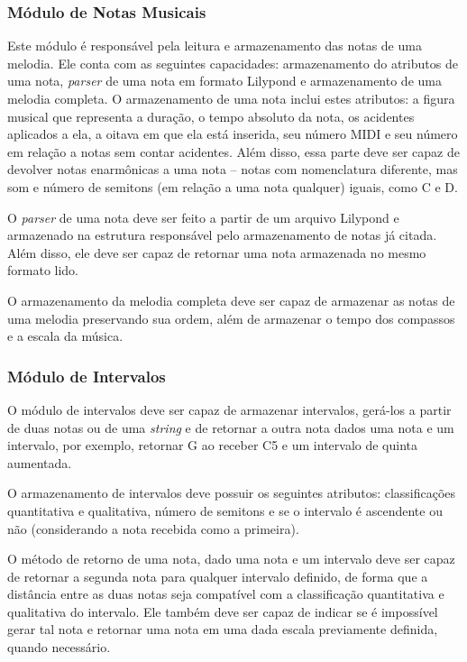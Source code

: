     \subsubsection[Módulo de Notas Musicais]{Módulo de Notas Musicais}

      Este módulo é responsável pela leitura e armazenamento das notas de uma melodia. Ele conta com as seguintes capacidades: armazenamento do atributos de uma nota, \textit{parser} de uma nota em formato Lilypond e armazenamento de uma melodia completa. O armazenamento de uma nota inclui estes atributos: a figura musical que representa a duração, o tempo absoluto da nota, os acidentes aplicados a ela, a oitava em que ela está inserida, seu número MIDI e seu número em relação a notas sem contar acidentes. Além disso, essa parte deve ser capaz de devolver notas enarmônicas a uma nota -- notas com nomenclatura diferente, mas som e número de semitons (em relação a uma nota qualquer) iguais, como C\sh{}  e D\fl.

      O \textit{parser} de uma nota deve ser feito a partir de um arquivo Lilypond e armazenado na estrutura responsável pelo armazenamento de notas já citada. Além disso, ele deve ser capaz de retornar uma nota armazenada no mesmo formato lido.

      O armazenamento da melodia completa deve ser capaz de armazenar as notas de uma melodia preservando sua ordem, além de armazenar o tempo dos compassos e a escala da música.

    \subsubsection[Módulo de Intervalos]{Módulo de Intervalos}

      O módulo de intervalos deve ser capaz de armazenar intervalos, gerá-los a partir de duas notas ou de uma \textit{string} e de retornar a outra nota dados uma nota e um intervalo, por exemplo, retornar G ao receber C5 e um intervalo de quinta aumentada.

      O armazenamento de intervalos deve possuir os seguintes atributos: classificações quantitativa e qualitativa, número de semitons e se o intervalo é ascendente ou não (considerando a nota recebida como a primeira).

      O método de retorno de uma nota, dado uma nota e um intervalo deve ser capaz de retornar a segunda nota para qualquer intervalo definido, de forma que a distância entre as duas notas seja compatível com a classificação quantitativa e qualitativa do intervalo. Ele também deve ser capaz de indicar se é impossível gerar tal nota e retornar uma nota em uma dada escala previamente definida, quando necessário.

